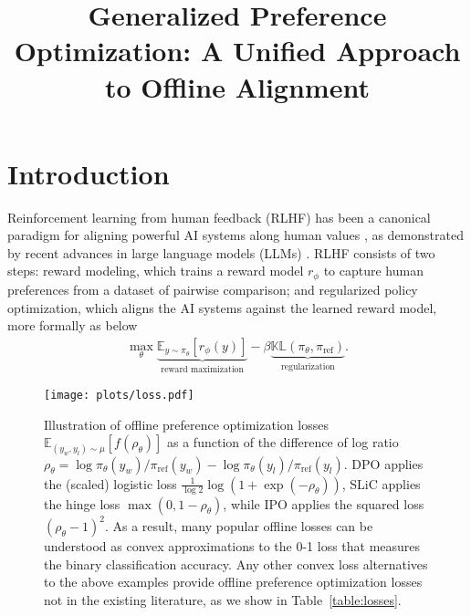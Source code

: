 \title{Generalized Preference Optimization:
A Unified Approach to Offline Alignment}



\maketitle

\section{Introduction}

Reinforcement learning from human feedback (RLHF) has been a canonical paradigm for aligning powerful AI systems along human values \citep{christiano2017deep,ouyang2022training}, as demonstrated by recent advances in large language models (LLMs) \citep{achiam2023gpt,team2023gemini}. RLHF consists of two steps: reward modeling, which trains a reward model $r_\phi$ to capture human preferences from a dataset of pairwise comparison; and regularized policy optimization, which aligns the AI systems against the learned reward model, more formally as below 
\begin{align*}
    \max_\theta  \underbrace{\mathbb{E}_{y\sim\pi_\theta}\left[r_\phi(y)\right]}_{\text{reward maximization}} - \beta \underbrace{\mathbb{KL}(\pi_\theta,\pi_\text{ref})}_{\text{regularization}}.
\end{align*}

\begin{figure}[t]
    \centering
    \texttt{[image: plots/loss.pdf]}
    \caption{\small{Illustration of offline preference optimization losses $\mathbb{E}_{(y_w,y_l)\sim\mu}\left[f\left(\rho_\theta\right)\right]$ as a function of the difference of log ratio $\rho_\theta=\log \pi_\theta(y_w) / \pi_\text{ref}(y_w) - \log \pi_\theta(y_l)/ \pi_\text{ref}(y_l)$. DPO  applies the (scaled) logistic loss $\frac{1}{\log 2}\log(1+\exp(-\rho_\theta))$, SLiC applies the hinge loss $\max(0,1-\rho_\theta)$, while IPO applies the squared loss $(\rho_\theta-1)^2$. As a result, many popular offline losses can be understood as convex approximations to the 0-1 loss that measures the binary classification accuracy. Any other convex loss alternatives to the above examples provide offline preference optimization losses not in the existing literature, as we show in Table~\ref{table:losses}.}}
    \label{fig:loss}
\end{figure}

